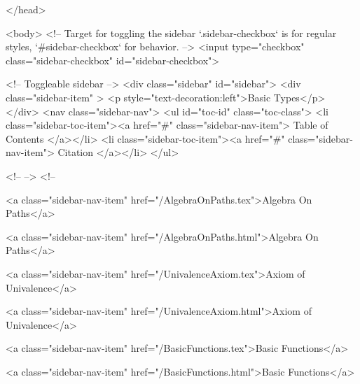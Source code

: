   
</head>




  <body>
    <!-- Target for toggling the sidebar `.sidebar-checkbox` is for regular
     styles, `#sidebar-checkbox` for behavior. -->
<input type="checkbox" class="sidebar-checkbox" id="sidebar-checkbox">

<!-- Toggleable sidebar -->
<div class="sidebar" id="sidebar">
  <div class="sidebar-item" >
    <p style="text-decoration:left">Basic Types</p>
  </div>
  <nav class="sidebar-nav">
    <ul id="toc-id" class="toc-class">
  <li class="sidebar-toc-item"><a href="#" class="sidebar-nav-item"> Table of Contents </a></li>
  <li class="sidebar-toc-item"><a href="#" class="sidebar-nav-item"> Citation </a></li>
</ul>


    <!--  -->
    <!-- 
      
    
      
    
      
    
      
        
      
    
      
        
          <a class="sidebar-nav-item" href="/AlgebraOnPaths.tex">Algebra On Paths</a>
        
      
    
      
        
          <a class="sidebar-nav-item" href="/AlgebraOnPaths.html">Algebra On Paths</a>
        
      
    
      
        
          <a class="sidebar-nav-item" href="/UnivalenceAxiom.tex">Axiom of Univalence</a>
        
      
    
      
        
          <a class="sidebar-nav-item" href="/UnivalenceAxiom.html">Axiom of Univalence</a>
        
      
    
      
        
          <a class="sidebar-nav-item" href="/BasicFunctions.tex">Basic Functions</a>
        
      
    
      
        
          <a class="sidebar-nav-item" href="/BasicFunctions.html">Basic Functions</a>
        
      
    
      
        
